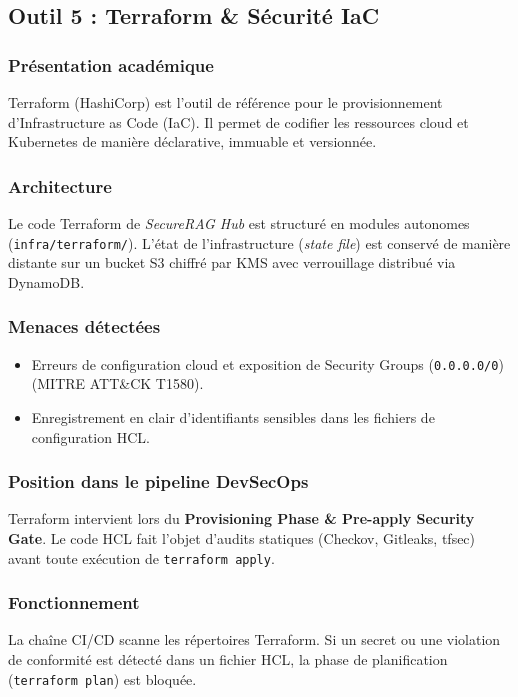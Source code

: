 \subsection{Outil 5 : Terraform \& Sécurité IaC}
\label{subsec:outil_terraform_iac}

\subsubsection{Présentation académique}
Terraform (HashiCorp) est l'outil de référence pour le provisionnement d'Infrastructure as Code (IaC). Il permet de codifier les ressources cloud et Kubernetes de manière déclarative, immuable et versionnée.

\subsubsection{Architecture}
Le code Terraform de \textit{SecureRAG Hub} est structuré en modules autonomes (\texttt{infra/terraform/}). L'état de l'infrastructure (\textit{state file}) est conservé de manière distante sur un bucket S3 chiffré par KMS avec verrouillage distribué via DynamoDB.

\subsubsection{Menaces détectées}
\begin{itemize}
    \item Erreurs de configuration cloud et exposition de Security Groups (\texttt{0.0.0.0/0}) (MITRE ATT\&CK T1580).
    \item Enregistrement en clair d'identifiants sensibles dans les fichiers de configuration HCL.
\end{itemize}

\subsubsection{Position dans le pipeline DevSecOps}
Terraform intervient lors du \textbf{Provisioning Phase \& Pre-apply Security Gate}. Le code HCL fait l'objet d'audits statiques (Checkov, Gitleaks, tfsec) avant toute exécution de \texttt{terraform apply}.

\subsubsection{Fonctionnement}
La chaîne CI/CD scanne les répertoires Terraform. Si un secret ou une violation de conformité est détecté dans un fichier HCL, la phase de planification (\texttt{terraform plan}) est bloquée.

